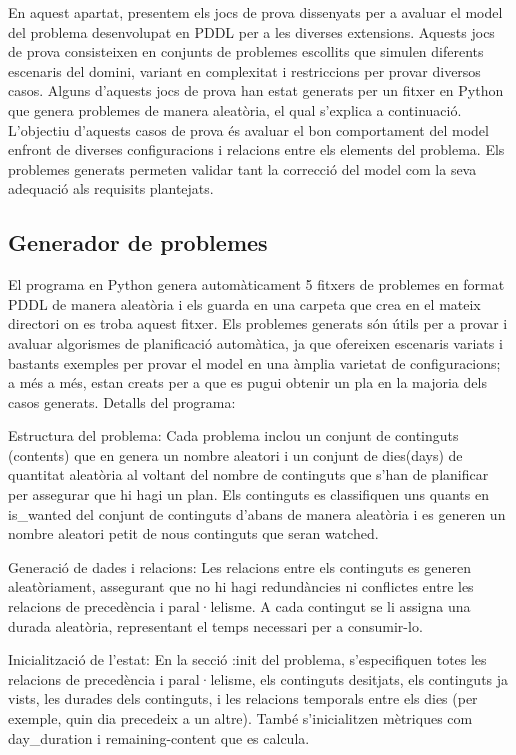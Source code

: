 \documentclass[a4paper]{article}
\begin{document}
	En aquest apartat, presentem els jocs de prova dissenyats per a avaluar el model del problema desenvolupat en PDDL per a les diverses extensions. Aquests jocs de prova consisteixen en conjunts de problemes escollits que simulen diferents escenaris del domini, variant en complexitat i restriccions per provar diversos casos. Alguns d'aquests jocs de prova han estat generats per un fitxer en Python que genera problemes de manera aleatòria, el qual s'explica a continuació. L'objectiu d'aquests casos de prova és avaluar el bon comportament del model enfront de diverses configuracions i relacions entre els elements del problema. Els problemes generats permeten validar tant la correcció del model com la seva adequació als requisits plantejats.
	

	
	\subsection{Generador de problemes}	
	
	El programa en Python genera automàticament 5 fitxers de problemes en format PDDL de manera aleatòria i els guarda en una carpeta que crea en el mateix directori on es troba aquest fitxer. Els problemes generats són útils per a provar i avaluar algorismes de planificació automàtica, ja que ofereixen escenaris variats i bastants exemples per provar el model  en una àmplia varietat de configuracions; a més a més, estan creats per a que es pugui obtenir un pla en la majoria dels casos generats. 
	Detalls del programa:
	
	Estructura del problema:
	Cada problema inclou un conjunt de continguts (contents) que en genera un nombre aleatori  i un conjunt de dies(days) de quantitat aleatòria al voltant del nombre de continguts que s'han de planificar per assegurar que hi hagi un plan. 
	Els continguts es classifiquen uns quants en is\_wanted del conjunt de continguts d'abans de manera aleatòria i es generen un nombre aleatori petit de nous continguts que seran watched.
	
	Generació de dades i relacions:
	Les relacions entre els continguts es generen aleatòriament, assegurant que no hi hagi redundàncies ni conflictes entre les relacions de precedència i paral·lelisme.
	A cada contingut se li assigna una durada aleatòria, representant el temps necessari per a consumir-lo.
	
	Inicialització de l'estat:
	En la secció :init del problema, s'especifiquen totes les relacions de precedència i paral·lelisme, els continguts desitjats, els continguts ja vists, les durades dels continguts, i les relacions temporals entre els dies (per exemple, quin dia precedeix a un altre).
	També s'inicialitzen mètriques com day\_duration i remaining-content que es calcula.
	
\end{document}
